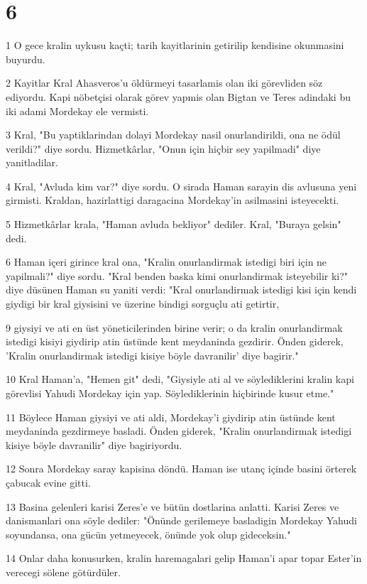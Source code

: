 \chapter{6}

\par 1 O gece kralin uykusu kaçti; tarih kayitlarinin getirilip kendisine okunmasini buyurdu.
\par 2 Kayitlar Kral Ahasveros'u öldürmeyi tasarlamis olan iki görevliden söz ediyordu. Kapi nöbetçisi olarak görev yapmis olan Bigtan ve Teres adindaki bu iki adami Mordekay ele vermisti.
\par 3 Kral, "Bu yaptiklarindan dolayi Mordekay nasil onurlandirildi, ona ne ödül verildi?" diye sordu. Hizmetkârlar, "Onun için hiçbir sey yapilmadi" diye yanitladilar.
\par 4 Kral, "Avluda kim var?" diye sordu. O sirada Haman sarayin dis avlusuna yeni girmisti. Kraldan, hazirlattigi daragacina Mordekay'in asilmasini isteyecekti.
\par 5 Hizmetkârlar krala, "Haman avluda bekliyor" dediler. Kral, "Buraya gelsin" dedi.
\par 6 Haman içeri girince kral ona, "Kralin onurlandirmak istedigi biri için ne yapilmali?" diye sordu. "Kral benden baska kimi onurlandirmak isteyebilir ki?" diye düsünen Haman su yaniti verdi: "Kral onurlandirmak istedigi kisi için kendi giydigi bir kral giysisini ve üzerine bindigi sorguçlu ati getirtir,
\par 9 giysiyi ve ati en üst yöneticilerinden birine verir; o da kralin onurlandirmak istedigi kisiyi giydirip atin üstünde kent meydaninda gezdirir. Önden giderek, 'Kralin onurlandirmak istedigi kisiye böyle davranilir' diye bagirir."
\par 10 Kral Haman'a, "Hemen git" dedi, "Giysiyle ati al ve söylediklerini kralin kapi görevlisi Yahudi Mordekay için yap. Söylediklerinin hiçbirinde kusur etme."
\par 11 Böylece Haman giysiyi ve ati aldi, Mordekay'i giydirip atin üstünde kent meydaninda gezdirmeye basladi. Önden giderek, "Kralin onurlandirmak istedigi kisiye böyle davranilir" diye bagiriyordu.
\par 12 Sonra Mordekay saray kapisina döndü. Haman ise utanç içinde basini örterek çabucak evine gitti.
\par 13 Basina gelenleri karisi Zeres'e ve bütün dostlarina anlatti. Karisi Zeres ve danismanlari ona söyle dediler: "Önünde gerilemeye basladigin Mordekay Yahudi soyundansa, ona gücün yetmeyecek, önünde yok olup gideceksin."
\par 14 Onlar daha konusurken, kralin haremagalari gelip Haman'i apar topar Ester'in verecegi sölene götürdüler.

